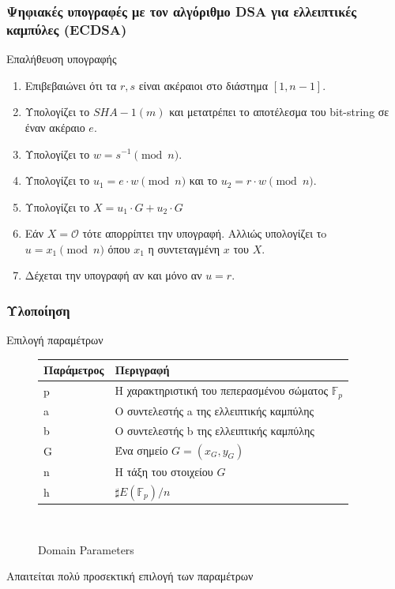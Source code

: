 \documentclass{beamer}
\begin{document}
%
\begin{frame}
\frametitle{Ψηφιακές υπογραφές με τον αλγόριθμο DSA για ελλειπτικές καμπύλες (ECDSA)}
\begin{block}
{Επαλήθευση υπογραφής}
\begin{small}
\begin{enumerate}
\item Επιβεβαιώνει ότι τα $r,s$ είναι ακέραιοι στο διάστημα $[1, n-1]$.
\item Υπολογίζει το $SHA-1(m)$ και μετατρέπει το αποτέλεσμα του bit-string σε έναν ακέραιο $e$.
\item Υπολογίζει το $w = s^{-1} \pmod n$.
\item Υπολογίζει το $u_1 = e \cdot w \pmod n$ και το $u_2 = r \cdot w \pmod n$.
\item Υπολογίζει το $X = u_1 \cdot G + u_2 \cdot G$
\item Εάν $X = \mathcal{O}$ τότε απορρίπτει την υπογραφή. Αλλιώς υπολογίζει τo $u = x_1 \pmod n$ όπου $x_1$ η συντεταγμένη $x$ του $X$. 
\item Δέχεται την υπογραφή αν και μόνο αν $u = r$.
\end{enumerate}
\end{small}
\end{block}
\end{frame}

%
\begin{frame}
\frametitle{Υλοποίηση}
\begin{block}
{Επιλογή παραμέτρων}
\begin{figure}[!htbp]
\begin{center}
\begin{tabular}{|l|l|} \hline
\textbf{Παράμετρος} & \textbf{Περιγραφή} \\ \hline
p & Η χαρακτηριστική του πεπερασμένου σώματος $\mathbb{F}_p$ \\ \hline
a & Ο συντελεστής a της ελλειπτικής καμπύλης \\ \hline
b & Ο συντελεστής b της ελλειπτικής καμπύλης \\ \hline
G & Ένα σημείο $G = (x_G, y_G)$  \\ \hline
n & Η τάξη του στοιχείου $G$ \\ \hline
h & $\sharp E(\mathbb{F}_p)/n$ \\ \hline
\end{tabular} \\
\end{center}
\caption{Domain Parameters}
\end{figure}
\alert{Απαιτείται πολύ προσεκτική επιλογή των παραμέτρων} \cite{ECDSA} \cite{SEC2} \cite{BPOOL}
\end{block}
\end{frame}
\end{document}
